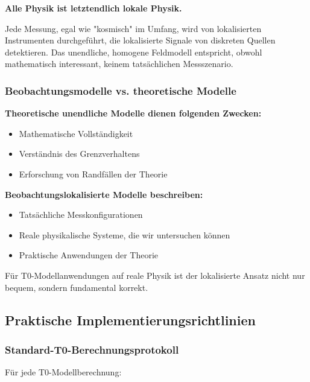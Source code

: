 \documentclass[12pt,a4paper]{article}
\begin{document}
\begin{tcolorbox}[colback=blue!5!white,colframe=blue!75!black,title=Philosophisches Prinzip]
	\textbf{Alle Physik ist letztendlich lokale Physik.}
	
	Jede Messung, egal wie "kosmisch" im Umfang, wird von lokalisierten Instrumenten durchgeführt, die lokalisierte Signale von diskreten Quellen detektieren. Das unendliche, homogene Feldmodell entspricht, obwohl mathematisch interessant, keinem tatsächlichen Messszenario.
\end{tcolorbox}

\subsubsection{Beobachtungsmodelle vs. theoretische Modelle}
\label{subsubsec:observational_vs_theoretical}

\textbf{Theoretische unendliche Modelle dienen folgenden Zwecken:}
\begin{itemize}
	\item Mathematische Vollständigkeit
	\item Verständnis des Grenzverhaltens  
	\item Erforschung von Randfällen der Theorie
\end{itemize}

\textbf{Beobachtungslokalisierte Modelle beschreiben:}
\begin{itemize}
	\item Tatsächliche Messkonfigurationen
	\item Reale physikalische Systeme, die wir untersuchen können
	\item Praktische Anwendungen der Theorie
\end{itemize}

Für T0-Modellanwendungen auf reale Physik ist der lokalisierte Ansatz nicht nur bequem, sondern fundamental korrekt.

\subsection{Praktische Implementierungsrichtlinien}
\label{subsec:practical_implementation}

\subsubsection{Standard-T0-Berechnungsprotokoll}
\label{subsubsec:standard_calculation_protocol}

Für jede T0-Modellberechnung:
\end{document}
